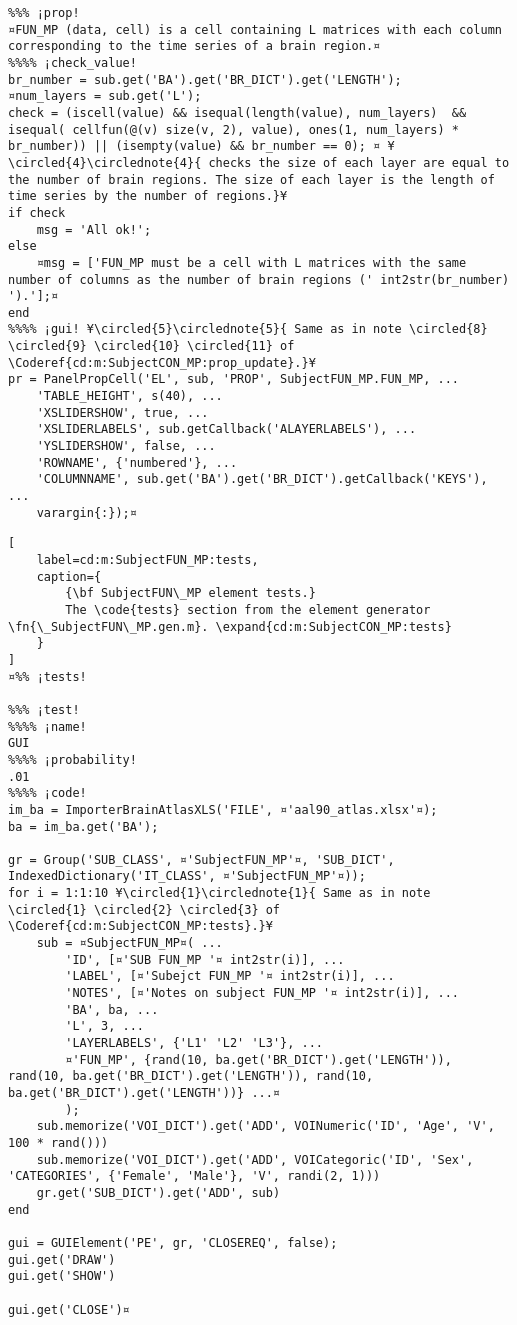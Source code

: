 \documentclass{tufte-handout}
\begin{document}
\begin{lstlisting}
%%% ¡prop!
¤FUN_MP (data, cell) is a cell containing L matrices with each column corresponding to the time series of a brain region.¤
%%%% ¡check_value!
br_number = sub.get('BA').get('BR_DICT').get('LENGTH');
¤num_layers = sub.get('L');
check = (iscell(value) && isequal(length(value), num_layers)  && isequal( cellfun(@(v) size(v, 2), value), ones(1, num_layers) * br_number)) || (isempty(value) && br_number == 0); ¤ ¥\circled{4}\circlednote{4}{ checks the size of each layer are equal to the number of brain regions. The size of each layer is the length of time series by the number of regions.}¥
if check
    msg = 'All ok!';
else   
    ¤msg = ['FUN_MP must be a cell with L matrices with the same number of columns as the number of brain regions (' int2str(br_number) ').'];¤
end
%%%% ¡gui! ¥\circled{5}\circlednote{5}{ Same as in note \circled{8} \circled{9} \circled{10} \circled{11} of \Coderef{cd:m:SubjectCON_MP:prop_update}.}¥
pr = PanelPropCell('EL', sub, 'PROP', SubjectFUN_MP.FUN_MP, ...
    'TABLE_HEIGHT', s(40), ...
    'XSLIDERSHOW', true, ...
    'XSLIDERLABELS', sub.getCallback('ALAYERLABELS'), ...
    'YSLIDERSHOW', false, ...
    'ROWNAME', {'numbered'}, ...
    'COLUMNNAME', sub.get('BA').get('BR_DICT').getCallback('KEYS'), ...
    varargin{:});¤

\end{lstlisting}

\begin{lstlisting}[
	label=cd:m:SubjectFUN_MP:tests,
	caption={
		{\bf SubjectFUN\_MP element tests.}
		The \code{tests} section from the element generator \fn{\_SubjectFUN\_MP.gen.m}. \expand{cd:m:SubjectCON_MP:tests}
	}
]
¤%% ¡tests!

%%% ¡test!
%%%% ¡name!
GUI
%%%% ¡probability!
.01
%%%% ¡code!
im_ba = ImporterBrainAtlasXLS('FILE', ¤'aal90_atlas.xlsx'¤);
ba = im_ba.get('BA');

gr = Group('SUB_CLASS', ¤'SubjectFUN_MP'¤, 'SUB_DICT', IndexedDictionary('IT_CLASS', ¤'SubjectFUN_MP'¤));
for i = 1:1:10 ¥\circled{1}\circlednote{1}{ Same as in note \circled{1} \circled{2} \circled{3} of \Coderef{cd:m:SubjectCON_MP:tests}.}¥
    sub = ¤SubjectFUN_MP¤( ...
        'ID', [¤'SUB FUN_MP '¤ int2str(i)], ...
        'LABEL', [¤'Subejct FUN_MP '¤ int2str(i)], ...
        'NOTES', [¤'Notes on subject FUN_MP '¤ int2str(i)], ...
        'BA', ba, ...
        'L', 3, ...
        'LAYERLABELS', {'L1' 'L2' 'L3'}, ...
        ¤'FUN_MP', {rand(10, ba.get('BR_DICT').get('LENGTH')), rand(10, ba.get('BR_DICT').get('LENGTH')), rand(10, ba.get('BR_DICT').get('LENGTH'))} ...¤
        );
    sub.memorize('VOI_DICT').get('ADD', VOINumeric('ID', 'Age', 'V', 100 * rand()))
    sub.memorize('VOI_DICT').get('ADD', VOICategoric('ID', 'Sex', 'CATEGORIES', {'Female', 'Male'}, 'V', randi(2, 1)))
    gr.get('SUB_DICT').get('ADD', sub)
end

gui = GUIElement('PE', gr, 'CLOSEREQ', false);
gui.get('DRAW')
gui.get('SHOW')

gui.get('CLOSE')¤
\end{lstlisting}
\end{document}

